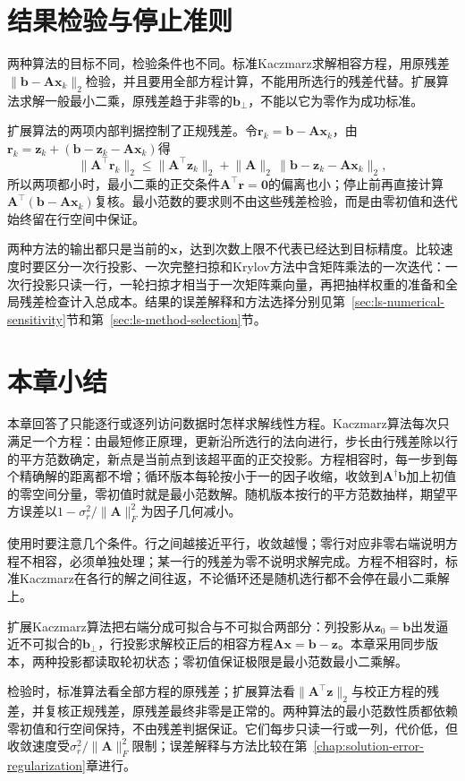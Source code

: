 \section{结果检验与停止准则}
\label{sec:ls-row-projection-stopping}

两种算法的目标不同，检验条件也不同。标准Kaczmarz求解相容方程，用原残差$\lVert\bm b-\bm A\bm x_k\rVert_2$检验，并且要用全部方程计算，不能用所选行的残差代替。扩展算法求解一般最小二乘，原残差趋于非零的$\bm b_\perp$，不能以它为零作为成功标准。

扩展算法的两项内部判据控制了正规残差。令$\bm r_k=\bm b-\bm A\bm x_k$，由$\bm r_k=\bm z_k+(\bm b-\bm z_k-\bm A\bm x_k)$得
\[
\lVert\bm A^\top\bm r_k\rVert_2\leq\lVert\bm A^\top\bm z_k\rVert_2+\lVert\bm A\rVert_2\,\lVert\bm b-\bm z_k-\bm A\bm x_k\rVert_2 ,
\]
所以两项都小时，最小二乘的正交条件$\bm A^\top\bm r=\bm 0$的偏离也小；停止前再直接计算$\bm A^\top(\bm b-\bm A\bm x_k)$复核。最小范数的要求则不由这些残差检验，而是由零初值和迭代始终留在行空间中保证。

两种方法的输出都只是当前的$\bm x$，达到次数上限不代表已经达到目标精度。比较速度时要区分一次行投影、一次完整扫掠和Krylov方法中含矩阵乘法的一次迭代：一次行投影只读一行，一轮扫掠才相当于一次矩阵乘向量，再把抽样权重的准备和全局残差检查计入总成本。结果的误差解释和方法选择分别见第~\ref{sec:ls-numerical-sensitivity}节和第~\ref{sec:ls-method-selection}节。

\FloatBarrier
\section{本章小结}
\label{sec:row-projection-summary}

本章回答了只能逐行或逐列访问数据时怎样求解线性方程。Kaczmarz算法每次只满足一个方程：由最短修正原理，更新沿所选行的法向进行，步长由行残差除以行的平方范数确定，新点是当前点到该超平面的正交投影。方程相容时，每一步到每个精确解的距离都不增；循环版本每轮按小于一的因子收缩，收敛到$\bm A^\dagger\bm b$加上初值的零空间分量，零初值时就是最小范数解。随机版本按行的平方范数抽样，期望平方误差以$1-\sigma_r^2/\lVert\bm A\rVert_F^2$为因子几何减小。

使用时要注意几个条件。行之间越接近平行，收敛越慢；零行对应非零右端说明方程不相容，必须单独处理；某一行的残差为零不说明求解完成。方程不相容时，标准Kaczmarz在各行的解之间往返，不论循环还是随机选行都不会停在最小二乘解上。

扩展Kaczmarz算法把右端分成可拟合与不可拟合两部分：列投影从$\bm z_0=\bm b$出发逼近不可拟合的$\bm b_\perp$，行投影求解校正后的相容方程$\bm A\bm x=\bm b-\bm z$。本章采用同步版本，两种投影都读取轮初状态；零初值保证极限是最小范数最小二乘解。

检验时，标准算法看全部方程的原残差；扩展算法看$\lVert\bm A^\top\bm z\rVert_2$与校正方程的残差，并复核正规残差，原残差最终非零是正常的。两种算法的最小范数性质都依赖零初值和行空间保持，不由残差判据保证。它们每步只读一行或一列，代价低，但收敛速度受$\sigma_r^2/\lVert\bm A\rVert_F^2$限制；误差解释与方法比较在第~\ref{chap:solution-error-regularization}章进行。
